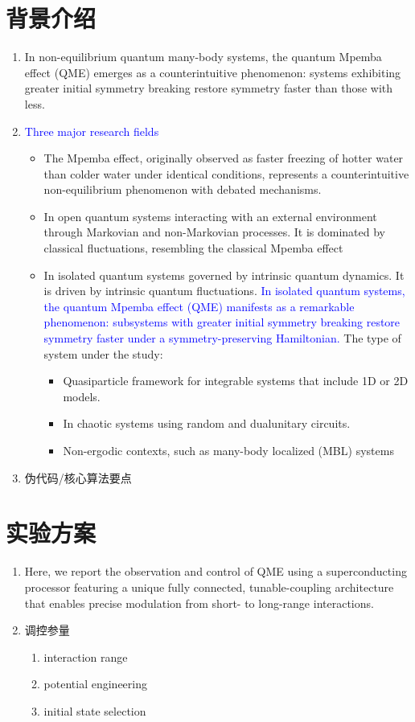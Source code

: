 \documentclass[11pt,a4paper]{article}
\begin{document}
\section{背景介绍}
\begin{enumerate}[leftmargin=*]
    \item In non-equilibrium quantum many-body systems, the quantum Mpemba effect (QME) emerges as a counterintuitive phenomenon: systems exhibiting greater initial symmetry breaking restore symmetry faster than those with less.
    \item \textcolor{blue}{Three major research fields}
        \begin{itemize}
        \item The Mpemba effect, originally observed as faster freezing of hotter water than colder water under identical conditions, represents a counterintuitive non-equilibrium phenomenon with debated mechanisms.
        \item In open quantum systems interacting with an external environment through Markovian and non-Markovian processes. It is dominated by classical fluctuations, resembling the classical Mpemba effect
        \item In isolated quantum systems governed by intrinsic quantum dynamics. It is driven by intrinsic quantum fluctuations. \textcolor{blue}{In isolated quantum systems, the quantum Mpemba effect (QME) manifests as a remarkable phenomenon: subsystems with greater initial symmetry breaking restore symmetry faster under a symmetry-preserving Hamiltonian.} The type of system under the study:
        \begin{itemize}
            \item Quasiparticle framework for integrable systems that include 1D or 2D models.
            \item In chaotic systems using random and dualunitary circuits.
            \item Non-ergodic contexts, such as many-body localized (MBL) systems
            \end{itemize}
        \end{itemize}
    \item 伪代码/核心算法要点
\end{enumerate}


\section{实验方案}
\begin{enumerate}
    \item Here, we report the observation and control of QME using a superconducting processor featuring a unique fully connected, tunable-coupling architecture that enables precise modulation from short- to long-range interactions.
    \item 调控参量
        \begin{enumerate}
            \item interaction range
            \item potential engineering 
            \item initial state selection
        \end{enumerate}
\end{enumerate}
\end{document}
